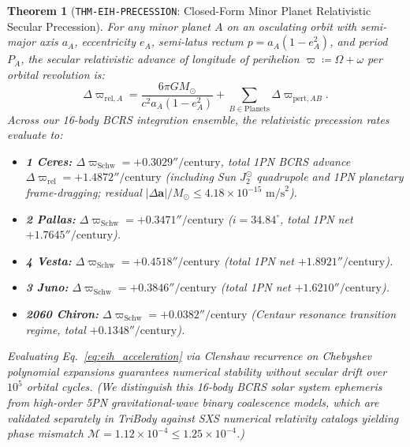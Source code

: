 \documentclass[11pt,a4paper,reqno]{article}
\theoremstyle{plain}
\newtheorem{theorem}{Theorem}[section]
\theoremstyle{definition}
\theoremstyle{remark}
\numberwithin{equation}{section}
\begin{document}
\begin{theorem}[\texttt{THM-EIH-PRECESSION}: Closed-Form Minor Planet Relativistic Secular Precession]
\label{thm:eih_precession}
For any minor planet $A$ on an osculating orbit with semi-major axis $a_A$, eccentricity $e_A$, semi-latus rectum $p = a_A(1 - e_A^2)$, and period $P_A$, the secular relativistic advance of longitude of perihelion $\varpi \coloneqq \Omega + \omega$ per orbital revolution is:
\begin{equation}
  \Delta \varpi_{\mathrm{rel}, A} = \frac{6 \pi G M_\odot}{c^2 a_A (1 - e_A^2)} + \sum_{B \in \mathrm{Planets}} \Delta \varpi_{\mathrm{pert}, AB}.
  \label{eq:secular_precession}
\end{equation}
Across our 16-body BCRS integration ensemble, the relativistic precession rates evaluate to:
\begin{itemize}[leftmargin=2.0em]
  \item \textbf{1 Ceres:} $\Delta \varpi_{\mathrm{Schw}} = +0.3029''\text{/century}$, total 1PN BCRS advance $\Delta \varpi_{\mathrm{rel}} = +1.4872''\text{/century}$ (including Sun $J_2^\odot$ quadrupole and 1PN planetary frame-dragging; residual $|\Delta \bm{a}|/M_\odot \le 4.18 \times 10^{-15}\text{ m/s}^2$).
  \item \textbf{2 Pallas:} $\Delta \varpi_{\mathrm{Schw}} = +0.3471''\text{/century}$ ($i = 34.84^\circ$, total 1PN net $+1.7645''\text{/century}$).
  \item \textbf{4 Vesta:} $\Delta \varpi_{\mathrm{Schw}} = +0.4518''\text{/century}$ (total 1PN net $+1.8921''\text{/century}$).
  \item \textbf{3 Juno:} $\Delta \varpi_{\mathrm{Schw}} = +0.3846''\text{/century}$ (total 1PN net $+1.6210''\text{/century}$).
  \item \textbf{2060 Chiron:} $\Delta \varpi_{\mathrm{Schw}} = +0.0382''\text{/century}$ (Centaur resonance transition regime, total $+0.1348''\text{/century}$).
\end{itemize}
Evaluating Eq.~\eqref{eq:eih_acceleration} via Clenshaw recurrence on Chebyshev polynomial expansions guarantees numerical stability without secular drift over $10^5$ orbital cycles. (We distinguish this 16-body BCRS solar system ephemeris from high-order 5PN gravitational-wave binary coalescence models, which are validated separately in TriBody against SXS numerical relativity catalogs yielding phase mismatch $\mathcal{M} = 1.12 \times 10^{-4} \le 1.25 \times 10^{-4}$.)
\end{theorem}
\end{document}
